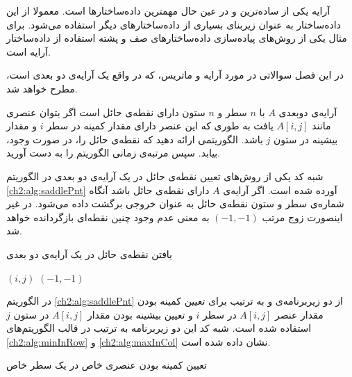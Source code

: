 
آرایه یکی از ساده‌ترین و در عین حال مهمترین داده‌ساختارها است. معمولا از این داده‌ساختار به عنوان زیربنای بسیاری از داده‌ساختارهای دیگر استفاده می‌شود. برای مثال یکی از روش‌های پیاده‌سازی داده‌ساختارهای صف و پشته استفاده از داده‌ساختار آرایه است.

در این فصل سوالاتی در مورد آرایه و ماتریس، که در واقع یک آرایه‌ی دو بعدی است، مطرح خواهد شد.



 آرایه‌ی دوبعدی {$A$} با {$n$} سطر و {$n$} ستون دارای نقطه‌ی حائل است اگر بتوان عنصری مانند {$A[i,j]$} یافت به طوری که این عنصر دارای مقدار کمینه در سطر {$i$} و مقدار بیشینه در ستون {$j$} باشد. الگوریتمی ارائه دهید که نقطه‌ی حائل را، در صورت وجود، بیابد. سپس مرتبه‌ی زمانی الگوریتم را به دست آورید.


شبه کد یکی از روش‌های تعیین نقطه‌ی حائل در یک آرایه‌ی دو بعدی در الگوریتم {\ref{ch2:alg:saddlePnt}} آورده شده است. اگر آرایه‌ی {$A$} دارای نقطه‌ی حائل باشد آنگاه شماره‌ی سطر و ستون نقطه‌ی حائل به عنوان خروجی برگشت داده می‌شود. در غیر اینصورت زوج مرتب {$(-1,-1)$} به معنی عدم وجود چنین نقطه‌ای بازگردانده خواهد شد.
\begin{algorithm}
\caption{یافتن نقطه‌ی حائل در یک آرایه‌ی دو بعدی}\label{ch2:alg:saddlePnt}
\begin{latin}
\begin{algorithmic}[1]
										\State	\Return $(i,j)$
								\EndIf
						\EndIf
				\EndFor
		\EndFor
		\State	\Return $(-1,-1)$
\EndFunction
\end{algorithmic}
\end{latin}
\end{algorithm}

در الگوریتم {\ref{ch2:alg:saddlePnt}} از دو زیربرنامه‌ی {} و {} به ترتیب برای تعیین کمینه بودن مقدار عنصر {$A[i,j]$} در سطر {$i$} و تعیین بیشینه بودن مقدار {$A[i,j]$} در ستون {$j$} استفاده شده است. شبه کد این دو زیربرنامه به ترتیب در قالب الگوریتم‌های {\ref{ch2:alg:minInRow}} و {\ref{ch2:alg:maxInCol}} نشان داده شده است.

\begin{algorithm}
\caption{تعیین کمینه بودن عنصری خاص در یک سطر خاص}\label{ch2:alg:minInRow}
\begin{latin}
\begin{algorithmic}[1]
						\State	\Return {}
				\EndIf
		\EndFor
		\State	\Return {}
\EndFunction
\end{algorithmic}
\end{latin}
\end{algorithm}

